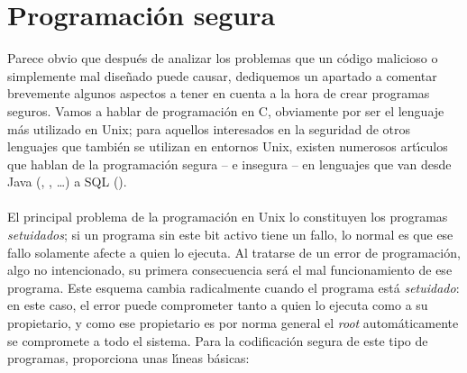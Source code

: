\section{Programaci\'on segura}
\label{progseg}
Parece obvio que despu\'es de analizar los problemas que un c\'odigo malicioso
o simplemente mal dise\~nado puede causar, dediquemos un apartado a comentar
brevemente algunos aspectos a tener en cuenta a la hora de crear programas
seguros. Vamos a hablar de programaci\'on en C, obviamente por ser el lenguaje
m\'as utilizado en Unix; para aquellos interesados en la seguridad de otros
lenguajes que tambi\'en se utilizan en entornos Unix, existen
numerosos art\'{\i}culos que hablan de la programaci\'on segura -- e insegura 
-- en lenguajes que van desde Java (\cite{kn:meh98}, \cite{kn:dea96}, 
\cite{kn:gal96a}\ldots) a SQL (\cite{kn:pol93}).\\
\\El principal problema de la programaci\'on en Unix lo constituyen los 
programas {\it setuidados}; si un programa sin este bit activo tiene un fallo,
lo normal es que ese fallo solamente afecte a quien lo ejecuta. Al tratarse
de un error de programaci\'on, algo no intencionado, su primera consecuencia
ser\'a el mal funcionamiento de ese programa. Este esquema cambia radicalmente
cuando el programa est\'a {\it setuidado}: en este caso, el error puede 
comprometer tanto a quien lo ejecuta como a su propietario, y como ese 
propietario es por norma general el {\it root} autom\'aticamente se compromete 
a todo el sistema. Para la codificaci\'on segura de este tipo de programas,
\cite{kn:bis86} proporciona unas l\'{\i}neas b\'asicas:
